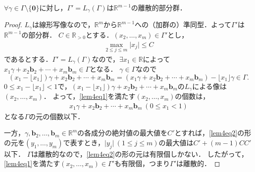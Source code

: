 \begin{screen}
  \begin{lem}
    \label{discrete_subgroup_lemma_4}
    $\forall\gamma\in\Gamma\setminus\{\boldsymbol{0}\}$に対し，$\Gamma'=L_\gamma(\Gamma)$は$\mathbb{R}^{m-1}$の離散的部分群．
  \end{lem}
\end{screen}
\begin{proof}
  $L_\gamma$は線形写像なので，$\mathbb{R}^m$から$\mathbb{R}^{m-1}$への（加群の）準同型．よって$\Gamma'$は$\mathbb{R}^{m-1}$の部分群．
  $C\in\mathbb{R}_{>0}$とする．$(x_2,\ldots,x_m)\in\Gamma'$とし，
  \begin{align}
    \max_{2\leq j\leq m}\lvert x_j\rvert\leq C\label{lem4eq1}
  \end{align}
  であるとする．$\Gamma'=L_\gamma(\Gamma)$なので，$\exists x_1\in\mathbb{R}$によって$x_1\gamma+x_2\boldsymbol{b}_2+\cdots+x_m\boldsymbol{b}_m\in\Gamma$となる．
  $\gamma\in\Gamma$なので
  \[(x_1-\lfloor x_1\rfloor)\gamma+x_2\boldsymbol{b}_2+\cdots+x_m\boldsymbol{b}_m=(x_1\gamma+x_2\boldsymbol{b}_2+\cdots+x_m\boldsymbol{b}_m)-\lfloor x_1\rfloor\gamma\in\Gamma.\]
  $0\leq x_1-\lfloor x_1\rfloor< 1$で，$(x_1-\lfloor x_1\rfloor)\gamma+x_2\boldsymbol{b}_2+\cdots+x_m\boldsymbol{b}_m$の$L_\gamma$による像は$(x_2,\ldots,x_m)$．
  よって，\eqref{lem4eq1}を満たす$(x_2,\ldots,x_m)$の個数は，
  \begin{align}
    x_1\gamma+x_2\boldsymbol{b}_2+\cdots+x_m\boldsymbol{b}_m\ (0\leq x_1< 1)\label{lem4eq2}
  \end{align}
  となる$\Gamma$の元の個数以下．

  一方，$\gamma,\boldsymbol{b}_2,\ldots,\boldsymbol{b}_m\in\mathbb{R}^m$の各成分の絶対値の最大値を$C'$とすれば，\eqref{lem4eq2}の形の元を$(y_1,\ldots,y_m)$で表すとき，$\lvert y_j\rvert\ (1\leq j\leq m)$の最大値は$C'+(m-1)CC'$以下．
  $\Gamma$は離散的なので，\eqref{lem4eq2}の形の元は有限個しかない．
  したがって，\eqref{lem4eq1}を満たす$(x_2,\ldots,x_m)\in\Gamma'$も有限個，つまり$\Gamma'$は離散的．
\end{proof}

